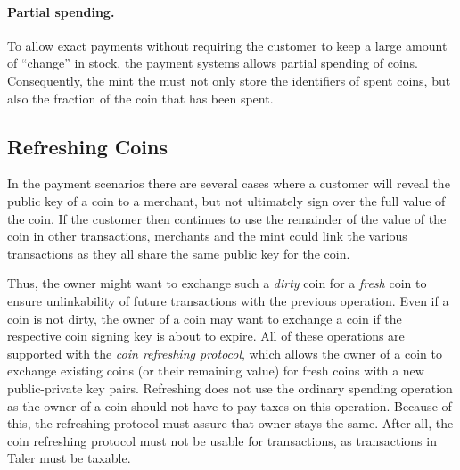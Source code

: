 \documentclass{llncs}
\begin{document}
\paragraph{Partial spending.}

To allow exact payments without requiring the customer to keep a large
amount of ``change'' in stock, the payment systems allows partial
spending of coins.  Consequently, the mint the must not only store the
identifiers of spent coins, but also the fraction of the coin that has
been spent.

%


\subsection{Refreshing Coins}

In the payment scenarios there are several cases where a customer will
reveal the public key of a coin to a merchant, but not ultimately sign
over the full value of the coin.  If the customer then continues to
use the remainder of the value of the coin in other transactions,
merchants and the mint could link the various transactions as they all
share the same public key for the coin.

Thus, the owner might want to exchange such a {\em dirty} coin for a
{\em fresh} coin to ensure unlinkability of future transactions with
the previous operation.  Even if a coin is not dirty, the owner of a
coin may want to exchange a coin if the respective coin signing key is
about to expire.  All of these operations are supported with the {\em
  coin refreshing protocol}, which allows the owner of a coin to
exchange existing coins (or their remaining value) for fresh coins
with a new public-private key pairs.  Refreshing does not use the
ordinary spending operation as the owner of a coin should not have to
pay taxes on this operation.  Because of this, the refreshing protocol
must assure that owner stays the same.  After all, the coin refreshing
protocol must not be usable for transactions, as transactions in Taler
must be taxable.
\end{document}

